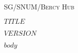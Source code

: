 \documentclass[a5paper]{article}
\begin{document}
  \begin{titlepage}
    \begin{center}
      \scshape{SG/SNUM/Bercy Hub}
    \end{center}

    \vspace*{\fill}
    \begin{center}
    {\huge\scshape $TITLE$}\label{sec:$title$}

    \vspace{1cm}

    {\large\bfseries $VERSION$}\label{subsec:$version$}
    \end{center}
    \vspace*{\fill}
  \end{titlepage}

  \newpage
  \newpage

  \begingroup
    \hypersetup{hidelinks}
    \tableofcontents
  \endgroup

  \newpage

  $body$
\end{document}
